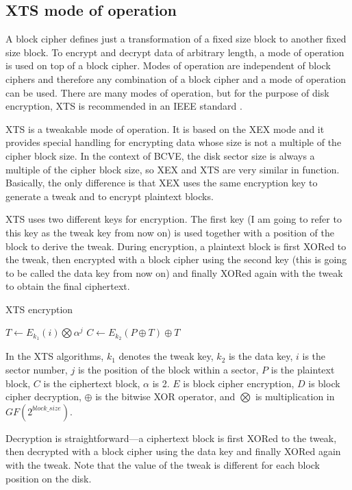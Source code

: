 \documentclass[thesis=B,english]{FITthesis}[2012/10/20]
\begin{document}
	\subsection{XTS mode of operation}
	
	A block cipher defines just a transformation of a fixed size block to another fixed size block. To encrypt and decrypt data of arbitrary length, a mode of operation is used on top of a block cipher. Modes of operation are independent of block ciphers and therefore any combination of a block cipher and a mode of operation can be used. There are many modes of operation, but for the purpose of disk encryption, XTS is recommended in an IEEE standard \cite{ieee_xts}.
	
	XTS is a tweakable \cite{tweak} mode of operation. It is based on the XEX mode and it provides special handling for encrypting data whose size is not a multiple of the cipher block size. In the context of BCVE, the disk sector size is always a multiple of the cipher block size, so XEX and XTS are very similar in function. Basically, the only difference is that XEX uses the same encryption key to generate a tweak and to encrypt plaintext blocks.
	
	XTS uses two different keys for encryption. The first key (I am going to refer to this key as the tweak key from now on) is used together with a position of the block to derive the tweak. During encryption, a plaintext block is first XORed to the tweak, then encrypted with a block cipher using the second key (this is going to be called the data key from now on) and finally XORed again with the tweak to obtain the final ciphertext.
	
	\begin{algorithm}
		\caption{XTS encryption
			\label{alg:xtse}}
		\begin{algorithmic}[1]
			\State $T\gets E_{k_1}(i) \bigotimes \alpha ^ j $
			\State $C\gets E_{k_2}(P \oplus T) \oplus T $
		\end{algorithmic}
	\end{algorithm}
	
	In the XTS algorithms, $k_1$ denotes the tweak key, $k_2$ is the data key, $i$ is the sector number, $j$ is the position of the block within a sector, $P$ is the plaintext block, $C$ is the ciphertext block, $\alpha$ is 2. $E$ is block cipher encryption, $D$ is block cipher decryption, $\oplus$ is the bitwise XOR operator, and $\bigotimes$ is multiplication in $GF(2 ^{block\_size})$.
	
	Decryption is straightforward---a ciphertext block is first XORed to the tweak, then decrypted with a block cipher using the data key and finally XORed again with the tweak. Note that the value of the tweak is different for each block position on the disk. 
	
\end{document}
